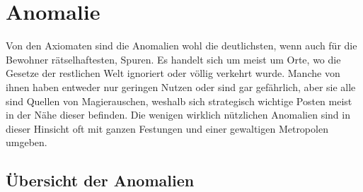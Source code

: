 \documentclass[a4paper,12pt,oneside]{book}
\begin{document}
\chapter{Anomalie}
Von den Axiomaten sind die Anomalien wohl die deutlichsten, wenn auch für die Bewohner rätselhaftesten, Spuren. Es handelt sich um meist um Orte, wo die Gesetze der restlichen Welt ignoriert oder völlig verkehrt wurde. Manche von ihnen haben entweder nur geringen Nutzen oder sind gar gefährlich, aber sie alle sind Quellen von Magierauschen, weshalb sich strategisch wichtige Posten meist in der Nähe dieser befinden. Die wenigen wirklich nützlichen Anomalien sind in dieser Hinsicht oft mit ganzen Festungen und einer gewaltigen Metropolen umgeben.

\section{Übersicht der Anomalien}
\end{document}
